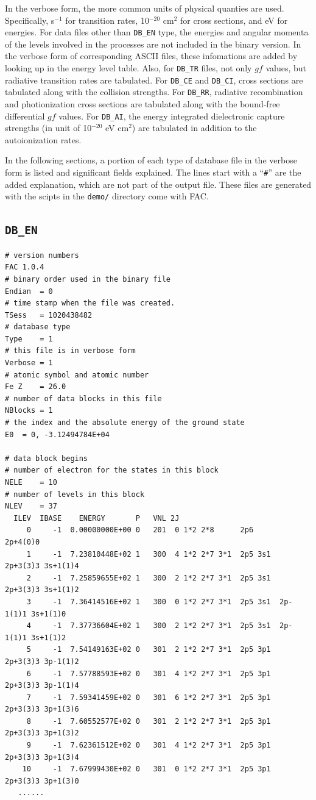\documentclass[twoside,letterpaper]{refrep}
\begin{document}
In the verbose form, the more common units of physical quanties are
used. Specifically, s$^{-1}$ for transition rates, 10$^{-20}$ cm$^2$ for cross
sections, and eV for energies. For data files other than \texttt{DB\_EN} type,
the energies and angular momenta of the levels involved in the processes are
not included in the binary version. In the verbose form of corresponding ASCII
files, these infomations are added by looking up in the energy level
table. Also, for \texttt{DB\_TR} files, not only $gf$ values, but radiative
transition rates are tabulated. For \texttt{DB\_CE} and \texttt{DB\_CI}, cross
sections are tabulated along with the collision strengths. For \texttt{DB\_RR},
radiative recombination and photionization cross sections are tabulated along
with the bound-free differential $gf$ values. For \texttt{DB\_AI}, the energy
integrated dielectronic capture strengths (in unit of 10$^{-20}$ eV cm$^2$)
are tabulated in addition to the autoionization rates.

In the following sections, a portion of each type of database file in the
verbose form is listed and significant fields explained. The lines start with
a ``\verb|#|'' are the added explanation, which are not part of the output
file. These files are generated with the scipts in the \texttt{demo/}
directory come with FAC.

\subsection{\texttt{DB\_EN}}
\begin{verbatim}
# version numbers
FAC 1.0.4
# binary order used in the binary file
Endian	= 0
# time stamp when the file was created.
TSess	= 1020438482
# database type
Type	= 1
# this file is in verbose form
Verbose	= 1
# atomic symbol and atomic number
Fe Z	= 26.0
# number of data blocks in this file
NBlocks	= 1
# the index and the absolute energy of the ground state
E0	= 0, -3.12494784E+04

# data block begins
# number of electron for the states in this block
NELE	= 10
# number of levels in this block
NLEV	= 37
  ILEV  IBASE    ENERGY       P   VNL 2J
     0     -1  0.00000000E+00 0   201  0 1*2 2*8      2p6      2p+4(0)0 
     1     -1  7.23810448E+02 1   300  4 1*2 2*7 3*1  2p5 3s1  2p+3(3)3 3s+1(1)4 
     2     -1  7.25859655E+02 1   300  2 1*2 2*7 3*1  2p5 3s1  2p+3(3)3 3s+1(1)2 
     3     -1  7.36414516E+02 1   300  0 1*2 2*7 3*1  2p5 3s1  2p-1(1)1 3s+1(1)0 
     4     -1  7.37736604E+02 1   300  2 1*2 2*7 3*1  2p5 3s1  2p-1(1)1 3s+1(1)2 
     5     -1  7.54149163E+02 0   301  2 1*2 2*7 3*1  2p5 3p1  2p+3(3)3 3p-1(1)2 
     6     -1  7.57788593E+02 0   301  4 1*2 2*7 3*1  2p5 3p1  2p+3(3)3 3p-1(1)4 
     7     -1  7.59341459E+02 0   301  6 1*2 2*7 3*1  2p5 3p1  2p+3(3)3 3p+1(3)6 
     8     -1  7.60552577E+02 0   301  2 1*2 2*7 3*1  2p5 3p1  2p+3(3)3 3p+1(3)2 
     9     -1  7.62361512E+02 0   301  4 1*2 2*7 3*1  2p5 3p1  2p+3(3)3 3p+1(3)4 
    10     -1  7.67999430E+02 0   301  0 1*2 2*7 3*1  2p5 3p1  2p+3(3)3 3p+1(3)0 
   ......
\end{verbatim}
\end{document}
